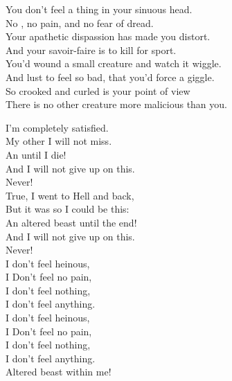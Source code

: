 



You don't feel a thing in your sinuous head. \\
No , no pain, and no fear of dread. \\

Your apathetic dispassion has made you distort. \\
And your savoir-faire is to kill for sport. \\

You'd wound a small creature and watch it wiggle. \\
And lust to feel so bad, that you'd force a giggle. \\

So crooked and curled is your point of view \\
There is no other creature more malicious than you. \\


I'm completely satisfied. \\
My other  I will not miss. \\
An  until I die! \\
And I will not give up on this. \\
Never! \\

True, I went to Hell and back, \\
But it was so I could be this: \\
An altered beast until the end! \\
And I will not give up on this. \\
Never! \\

I don't feel heinous, \\
I Don't feel no pain, \\
I don't feel nothing, \\
I don't feel anything. \\
I don't feel heinous, \\
I Don't feel no pain, \\
I don't feel nothing, \\
I don't feel anything. \\
Altered beast within me! \\

